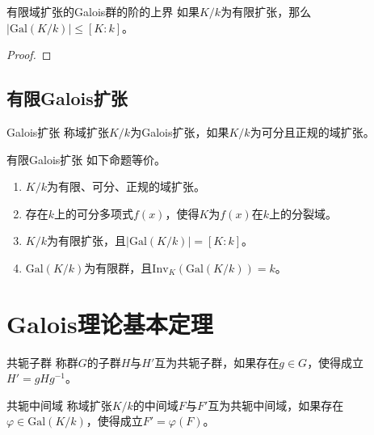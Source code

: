 \documentclass[lang = cn, scheme = chinese, thmcnt = section, usesamecnt]{elegantbook}
\newcommand{\Gal}{\mathrm{Gal}}
\newcommand{\Inv}{\mathrm{Inv}}
\begin{document}
\begin{proposition}{}{有限域扩张的Galois群的阶的上界}
	如果$K/k$为有限扩张，那么$|\Gal(K/k)|\le [K:k]$。
\end{proposition}

\begin{proof}
	
\end{proof}

\section{有限Galois扩张}

\begin{definition}{Galois扩张}
	称域扩张$K/k$为Galois扩张，如果$K/k$为可分且正规的域扩张。
\end{definition}

\begin{theorem}{有限Galois扩张}
	如下命题等价。
	\begin{enumerate}
		\item $K/k$为有限、可分、正规的域扩张。
		\item 存在$k$上的可分多项式$f(x)$，使得$K$为$f(x)$在$k$上的分裂域。
		\item $K/k$为有限扩张，且$|\Gal(K/k)|=[K:k]$。
		\item $\Gal(K/k)$为有限群，且$\Inv_K(\Gal(K/k))=k$。
	\end{enumerate}
\end{theorem}

\chapter{Galois理论基本定理}

\begin{definition}{共轭子群}
	称群$G$的子群$H$与$H'$互为共轭子群，如果存在$g\in G$，使得成立$H'=gHg^{-1}$。
\end{definition}

\begin{definition}{共轭中间域}
	称域扩张$K/k$的中间域$F$与$F'$互为共轭中间域，如果存在$\varphi\in \Gal(K/k)$，使得成立$F'=\varphi(F)$。
\end{definition}
\end{document}
